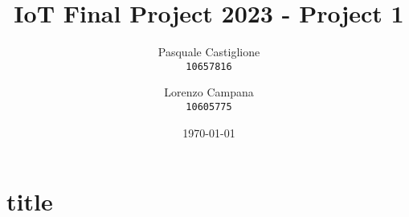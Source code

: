 \documentclass[11pt]{article}
\title{\textbf{IoT Final Project 2023 - Project 1}}
\author{
  Pasquale Castiglione\\
	\texttt{10657816}
  \and
  Lorenzo Campana\\
  \texttt{10605775}
}
\date{\today}
\begin{document}
\maketitle
\section*{title}
\end{document}
